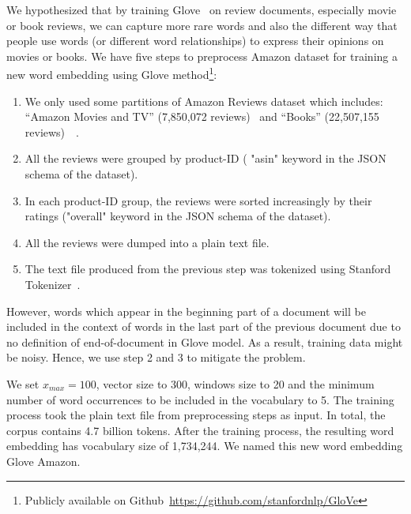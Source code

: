 We hypothesized that by training Glove~\cite{glove} on review documents, especially movie or book reviews, we can capture more rare words and also the different way that people use words (or different word relationships) to express their opinions on movies or books.
%
We have five steps to preprocess Amazon dataset for training a new word embedding using Glove method\footnote{Publicly available on Github~\url{https://github.com/stanfordnlp/GloVe}}:
\begin{enumerate}
	\item We only used some partitions of Amazon Reviews dataset which includes:  ``Amazon Movies and TV'' (7,850,072 reviews)~\cite{mcauley2013hidden} and ``Books'' (22,507,155 reviews)~\cite{McAuleyTSH15}~\cite{HeM16}.
	\item All the reviews were grouped by product-ID ( "asin" keyword in the JSON schema of the dataset).
	\item In each product-ID group, the reviews were sorted increasingly by their ratings ("overall" keyword in the JSON schema of the dataset).
	\item All the reviews were dumped into a plain text file.
	\item The text file produced from the previous step was tokenized using Stanford Tokenizer~\cite{tokenizerpart}.
\end{enumerate}
However, words which appear in the beginning part of a document will be included in the context of words in the last part of the previous document due to no definition of end-of-document in Glove model. As a result, training data might be noisy. Hence, we use step 2 and 3 to mitigate the problem.

We set $x_{max} = 100$, vector size to 300, windows size to 20 and the minimum number of word occurrences to be included in the vocabulary to 5.
The training process took the plain text file from preprocessing steps as input.
In total, the corpus contains 4.7 billion tokens.
After the training process, the resulting word embedding has vocabulary size of 1,734,244.
We named this new word embedding Glove Amazon.
